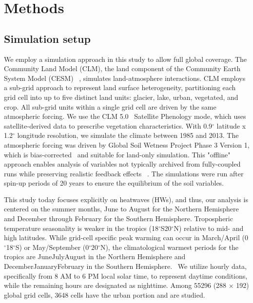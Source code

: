 \section*{Methods}




\subsection*{Simulation setup }We employ a simulation approach in this study to allow full global coverage. The Community Land Model (CLM), the land component of the Community Earth System Model (CESM)\unskip~\cite{2755510:33598890} , simulates land-atmosphere interactions. CLM employs a sub-grid approach to represent land surface heterogeneity, partitioning each grid cell into up to five distinct land units:   glacier, lake, urban, vegetated, and crop. All sub-grid units within a single grid cell are driven by the same atmospheric forcing. We use the CLM 5.0\unskip~\cite{2755510:33598910}  Satellite Phenology mode, which uses satellite-derived data to prescribe vegetation characteristics. With 0.9\ensuremath{^\circ} latitude x 1.2\ensuremath{^\circ} longitude resolution, we simulate the climate between 1985 and 2013.  The atmospheric forcing was driven by Global Soil Wetness Project Phase 3 Version 1, which is bias-corrected\unskip~\cite{2755510:33598910}  and suitable for land-only simulation. This "offline" approach enables analysis of variables not typically archived from fully-coupled runs while preserving realistic feedback effects\unskip~\cite{2755510:33598945} . The simulations were run after spin-up periods of 20 years to ensure the equilibrium of the soil variables.

This study today focuses explicitly on heatwaves (HWs), and thus, our analysis is centered on the summer months, June to August for the Northern Hemisphere and December through February for the Southern Hemisphere. Tropospheric temperature seasonality is weaker in the tropics (18\ensuremath{^\circ}S{\textendash}20\ensuremath{^\circ}N) relative to mid- and high latitudes. While grid-cell specific peak warming can occur in March/April (0\ensuremath{^\circ}{\textendash}18\ensuremath{^\circ}S) or May/September (0\ensuremath{^\circ}{\textendash}20\ensuremath{^\circ}N), the climatological warmest periods for the tropics are June{\textendash}July{\textendash}August in the Northern Hemisphere and December{\textendash}January{\textendash}February in the Southern Hemisphere.\unskip~\cite{2755510:33598947}  We utilize hourly data, specifically from 8 AM to 6 PM local solar time, to represent daytime conditions, while the remaining hours are designated as nighttime. Among 55296 (288 \ensuremath{\times} 192) global grid cells, 3648 cells have the urban portion and are studied.





